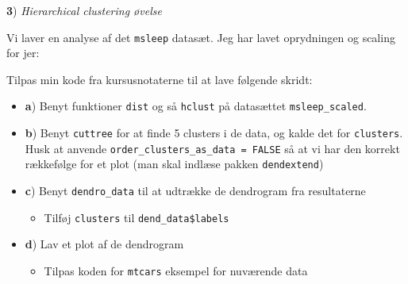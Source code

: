 \documentclass[
]{book}
\newenvironment{Shaded}{\begin{snugshade}}{\end{snugshade}}
\newcommand{\FunctionTok}[1]{\textcolor[rgb]{0.00,0.00,0.00}{#1}}
\newcommand{\NormalTok}[1]{#1}
\newcommand{\OtherTok}[1]{\textcolor[rgb]{0.56,0.35,0.01}{#1}}
\newcommand{\SpecialCharTok}[1]{\textcolor[rgb]{0.00,0.00,0.00}{#1}}
\providecommand{\tightlist}{%
  \setlength{\itemsep}{0pt}\setlength{\parskip}{0pt}}
\begin{document}
\textbf{3}) \emph{Hierarchical clustering øvelse}

Vi laver en analyse af det \texttt{msleep} datasæt. Jeg har lavet oprydningen og scaling for jer:

\begin{Shaded}
\end{Shaded}

Tilpas min kode fra kursusnotaterne til at lave følgende skridt:

\begin{itemize}
\item
  \textbf{a}) Benyt funktioner \texttt{dist} og så \texttt{hclust} på datasættet \texttt{msleep\_scaled}.
\item
  \textbf{b}) Benyt \texttt{cuttree} for at finde 5 clusters i de data, og kalde det for \texttt{clusters}. Husk at anvende \texttt{order\_clusters\_as\_data\ =\ FALSE} så at vi har den korrekt rækkefølge for et plot (man skal indlæse pakken \texttt{dendextend})
\item
  \textbf{c}) Benyt \texttt{dendro\_data} til at udtrække de dendrogram fra resultaterne

  \begin{itemize}
  \tightlist
  \item
    Tilføj \texttt{clusters} til \texttt{dend\_data\$labels}
  \end{itemize}
\item
  \textbf{d}) Lav et plot af de dendrogram

  \begin{itemize}
  \tightlist
  \item
    Tilpas koden for \texttt{mtcars} eksempel for nuværende data
  \end{itemize}
\end{itemize}
\end{document}
